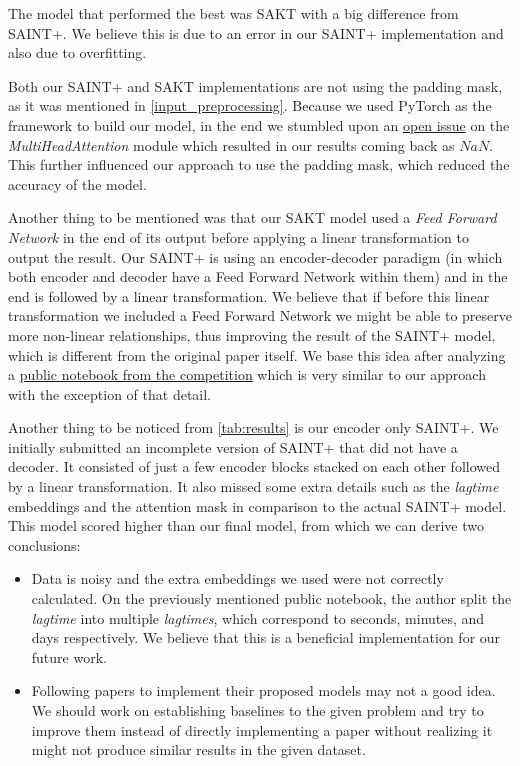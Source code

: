 \documentclass{article}
\begin{document}
The model that performed the best was SAKT with a big difference from SAINT+. We believe this is due to an error in our SAINT+ implementation and also due to overfitting. 

Both our SAINT+ and SAKT implementations are not using the padding mask, as it was mentioned in \autoref{input_preprocessing}. Because we used PyTorch as the framework to build our model, in the end we stumbled upon an \href{https://github.com/pytorch/pytorch/issues/41508}{open issue} on the \textit{MultiHeadAttention} module which resulted in our results coming back as $NaN$. This further influenced our approach to use the padding mask, which reduced the accuracy of the model.

Another thing to be mentioned was that our SAKT model used a \textit{Feed Forward Network} in the end of its output before applying a linear transformation to output the result. Our SAINT+ is using an encoder-decoder paradigm (in which both encoder and decoder have a Feed Forward Network within them) and in the end is followed by a linear transformation. We believe that if before this linear transformation we included a Feed Forward Network we might be able to preserve more non-linear relationships, thus improving the result of the SAINT+ model, which is different from the original paper itself. We base this idea after analyzing a \href{https://www.kaggle.com/m10515009/saint-is-all-you-need-training-private-0-801}{public notebook from the competition} which is very similar to our approach with the exception  of that detail.

Another thing to be noticed from \autoref{tab:results} is our encoder only SAINT+. We initially submitted an incomplete version of SAINT+ that did not have a decoder. It consisted of just a few encoder blocks stacked on each other followed by a linear transformation. It also missed some extra details such as the \textit{lagtime} embeddings and the attention mask in comparison to the actual SAINT+ model. This model scored higher than our final model, from which we can derive two conclusions:
\begin{itemize}
    \item Data is noisy and the extra embeddings we used were not correctly calculated. On the previously mentioned public notebook, the author split the \textit{lagtime} into multiple \textit{lagtimes}, which correspond to seconds, minutes, and days respectively. We believe that this is a beneficial implementation for our future work.
    \item Following papers to implement their proposed models may not a good idea. We should work on establishing baselines to the given problem and try to improve them instead of directly implementing a paper without realizing it might not produce similar results in the given dataset.
\end{itemize}
\end{document}
